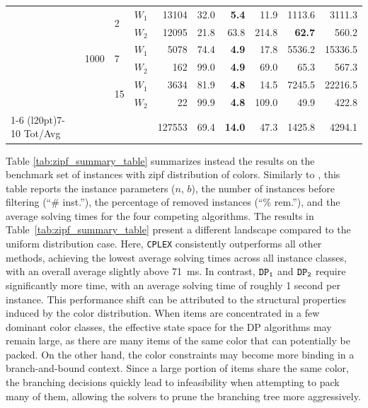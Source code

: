\documentclass[preprint,11pt]{elsarticle}
\newcommand{\capacity}{b}
\newcommand{\firstDP}{{\tt DP_1}}
\newcommand{\secondDP}{{\tt DP_2}}
\theoremstyle{definition}
\begin{document}
\begin{table}
\begin{tabular}{llllrrrrrr}
 & \multirow[t]{6}{*}{\num{1000}} & \multirow[t]{2}{*}{\num{2}} & $W_1$ & \num{13104} & \num{32.0} & \textbf{\num{5.4}} & \num{11.9} & \num{1113.6} & \num{3111.3} \\
 &  &  & $W_2$ & \num{12095} & \num{21.8} & \num{63.8} & \num{214.8} & \textbf{\num{62.7}} & \num{560.2} \\[0.7ex]
 &  & \multirow[t]{2}{*}{\num{7}} & $W_1$ & \num{5078} & \num{74.4} & \textbf{\num{4.9}} & \num{17.8} & \num{5536.2} & \num{15336.5} \\
 &  &  & $W_2$ & \num{162} & \num{99.0} & \textbf{\num{4.9}} & \num{69.0} & \num{65.3} & \num{567.3} \\[0.7ex]
 &  & \multirow[t]{2}{*}{\num{15}} & $W_1$ & \num{3634} & \num{81.9} & \textbf{\num{4.8}} & \num{14.5} & \num{7245.5} & \num{22216.5} \\
 &  &  & $W_2$ & \num{22} & \num{99.9} & \textbf{\num{4.8}} & \num{109.0} & \num{49.9} & \num{422.8} \\[1.5ex]
\cmidrule{1-6} \cmidrule(l{20pt}){7-10}
Tot/Avg &  &  &  & \num{127553} & \num{69.4} & \textbf{\num{14.0}} & \num{47.3} & \num{1425.8} & \num{4294.1} \\
\bottomrule
\end{tabular}

    \label{tab:uniform_summary_table}
\end{table}

\medskip

Table \ref{tab:zipf_summary_table} summarizes instead the results on the benchmark set of instances with zipf distribution of colors. Similarly to , this table reports the instance parameters ($n$, $\capacity$), the number of  instances before filtering (``\# inst.''), the percentage of removed instances (``\% rem.''), and the average solving times for the four competing algorithms.
The results in Table~\ref{tab:zipf_summary_table} present a different landscape compared to the uniform distribution case. Here, {\tt CPLEX} consistently outperforms all other methods, achieving the lowest average solving times across all instance classes, with an overall average slightly above \qty{71}{\milli\second}.
In contrast, $\firstDP$ and $\secondDP$ require significantly more time, with an average solving time of roughly 1 second per instance.
This performance shift can be attributed to the structural properties induced by the color distribution. When items are concentrated in a few dominant color classes, the effective state space for the DP algorithms may remain large, as there are many items of the same color that can potentially be packed. On the other hand, the color constraints may become more binding in a branch-and-bound context. Since a large portion of items share the same color, the branching decisions quickly lead to infeasibility when attempting to pack many of them, allowing the solvers to prune the branching tree more aggressively.
\end{document}
